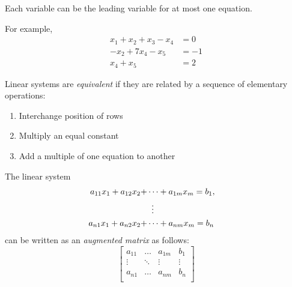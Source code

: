 \begin{definition}
Each variable can be the leading variable for at most one equation.
\end{definition}
For example, 
\begin{equation}
    \begin{aligned}
        x_1 + x_2 + x_3 - x_4 &=0\\
        -x_2 + 7x_4 - x_5 &=-1\\
        x_4+x_5&=2
    \end{aligned}
\end{equation}

\begin{definition}
Linear systems are \emph{equivalent} if they are related by a sequence of elementary operations:
    \begin{enumerate}[label={(\theenumi)}]
        \item Interchange position of rows
        \item Multiply an equal constant
        \item Add a multiple of one equation to another
    \end{enumerate}
\end{definition}

\begin{definition}
The linear system
\begin{equation}
\label{eq:lk}
    \begin{aligned}
        a_{11}x_1+a_{12}x_2+&\cdots+a_{1m}x_m= b_1,\\
        &\mathrel{\makebox[\widthof{=}]{\vdots}}  &\\
        a_{n1}x_1+a_{n2}x_2+&\cdots+a_{nm}x_m= b_n
    \end{aligned}
\end{equation}
can be written as an \emph{augmented matrix} as follows:
    \begin{equation}
        \begin{bmatrix}
        a_{11} & \dots & a_{1m} & b_1 \\
        \vdots & \ddots & \vdots & \vdots \\
        a_{n1} & \dots & a_{nm} & b_n \\
        \end{bmatrix}
    \end{equation}
\end{definition}

